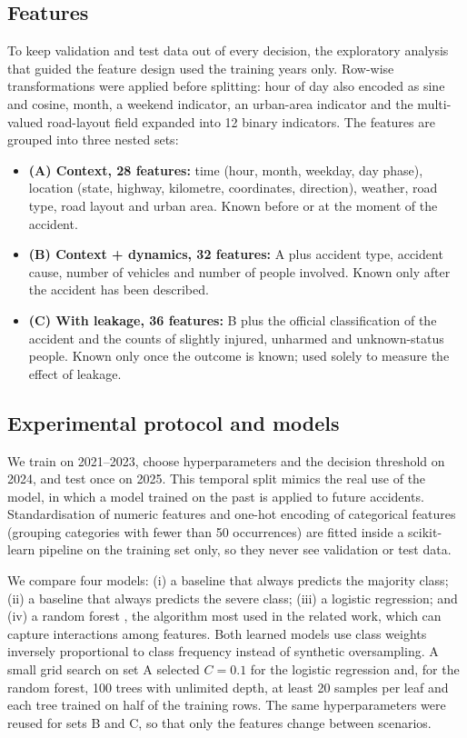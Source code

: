 \documentclass[12pt]{article}
\begin{document}
\subsection{Features}

To keep validation and test data out of every decision, the exploratory
analysis that guided the feature design used the training years only.
Row-wise transformations were applied before splitting: hour of day also
encoded as sine and cosine, month, a weekend indicator, an urban-area indicator
and the multi-valued road-layout field expanded into 12 binary indicators. The
features are grouped into three nested sets:

\begin{itemize}
\item \textbf{(A) Context, 28 features:} time (hour, month, weekday, day
phase), location (state, highway, kilometre, coordinates, direction), weather,
road type, road layout and urban area. Known before or at the moment of the
accident.
\item \textbf{(B) Context + dynamics, 32 features:} A plus accident type,
accident cause, number of vehicles and number of people involved. Known only
after the accident has been described.
\item \textbf{(C) With leakage, 36 features:} B plus the official
classification of the accident and the counts of slightly injured, unharmed
and unknown-status people. Known only once the outcome is known; used solely
to measure the effect of leakage.
\end{itemize}

\subsection{Experimental protocol and models}

We train on 2021--2023, choose hyperparameters and the decision threshold on
2024, and test once on 2025. This temporal split mimics the real use of the
model, in which a model trained on the past is applied to future accidents.
Standardisation of numeric features and one-hot encoding of categorical
features (grouping categories with fewer than 50 occurrences) are fitted inside
a scikit-learn pipeline \cite{pedregosa2011} on the training set only, so they
never see validation or test data.

We compare four models: (i) a baseline that always predicts the majority
class; (ii) a baseline that always predicts the severe class; (iii) a logistic
regression; and (iv) a random forest \cite{breiman2001}, the algorithm most
used in the related work, which can capture interactions among features. Both
learned models use class weights inversely proportional to class frequency
instead of synthetic oversampling. A small grid search on set A selected
$C = 0.1$ for the logistic regression and, for the random forest, 100 trees
with unlimited depth, at least 20 samples per leaf and each tree trained on
half of the training rows. The same hyperparameters were reused for sets B and
C, so that only the features change between scenarios.
\end{document}
